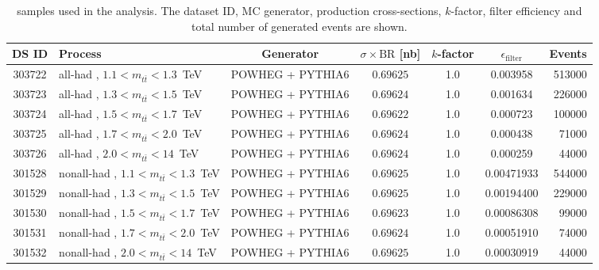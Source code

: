 \begin{table}[!htb]
\begin{small}
\begin{center}
\begin{tabular}{|c|l|c|c|c|c|r|}
        \hline
        DS ID & Process & Generator & $\sigma\times\text{BR}$ [nb] & $k$-factor & $\epsilon_{\text{filter}}$ & Events \\ \hline		
303722	& all-had \ttbar, $1.1 < m_{t\bar{t}} < 1.3$~TeV & POWHEG + PYTHIA6	&	$0.69625$ & 1.0 & 0.003958 &  513000 \\
303723	& all-had \ttbar, $1.3 < m_{t\bar{t}} < 1.5$~TeV & POWHEG + PYTHIA6	&	$0.69624$ & 1.0 & 0.001634 &  226000 \\
303724	& all-had \ttbar, $1.5 < m_{t\bar{t}} < 1.7$~TeV & POWHEG + PYTHIA6	&	$0.69622$ & 1.0 & 0.000723 &  100000 \\
303725	& all-had \ttbar, $1.7 < m_{t\bar{t}} < 2.0$~TeV & POWHEG + PYTHIA6	&	$0.69624$ & 1.0 & 0.000438 &  71000 \\
303726	& all-had \ttbar, $2.0 < m_{t\bar{t}} < 14$~TeV & POWHEG + PYTHIA6	&	$0.69624$ & 1.0 & 0.000259 &  44000 \\

301528	& nonall-had \ttbar, $1.1 < m_{t\bar{t}} < 1.3$~TeV & POWHEG + PYTHIA6	&	$0.69625$ & 1.0 & 0.00471933 &  544000 \\
301529	& nonall-had \ttbar, $1.3 < m_{t\bar{t}} < 1.5$~TeV & POWHEG + PYTHIA6	&	$0.69625$ & 1.0 & 0.00194400 &  229000 \\
301530	& nonall-had \ttbar, $1.5 < m_{t\bar{t}} < 1.7$~TeV & POWHEG + PYTHIA6	&	$0.69623$ & 1.0 & 0.00086308 &  99000 \\
301531	& nonall-had \ttbar, $1.7 < m_{t\bar{t}} < 2.0$~TeV & POWHEG + PYTHIA6	&	$0.69624$ & 1.0 & 0.00051910 &  74000 \\
301532	& nonall-had \ttbar, $2.0 < m_{t\bar{t}} < 14$~TeV & POWHEG + PYTHIA6	&	$0.69625$ & 1.0 & 0.00030919 &  44000 \\
\hline

\end{tabular}
\caption{\ttbar samples used in the analysis. The dataset ID, MC generator, production cross-sections,
$k$-factor, filter efficiency and total number of generated events are shown.}
\label{tab:tt}
\end{center}
\end{small}
\end{table}


%

